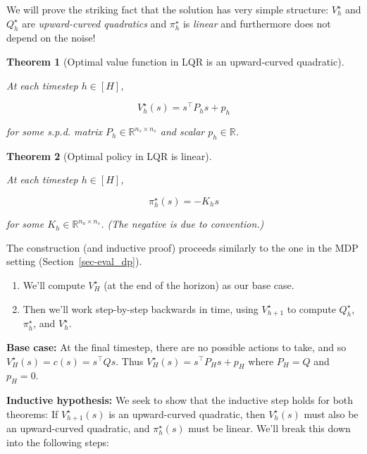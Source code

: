 \documentclass[
  letterpaper,
  DIV=11,
  numbers=noendperiod]{scrreprt}
\providecommand{\tightlist}{%
  \setlength{\itemsep}{0pt}\setlength{\parskip}{0pt}}\usepackage{longtable,booktabs,array}
\theoremstyle{plain}
\theoremstyle{plain}
\newtheorem{theorem}{Theorem}[chapter]
\theoremstyle{definition}
\theoremstyle{definition}
\theoremstyle{remark}
\begin{document}
We will prove the striking fact that the solution has very simple
structure: \(V_h^\star\) and \(Q^\star_h\) are \emph{upward-curved
quadratics} and \(\pi_h^\star\) is \emph{linear} and furthermore does
not depend on the noise!

\begin{theorem}[Optimal value function in LQR is an upward-curved
quadratic]\protect\hypertarget{thm-optimal_value_lqr_quadratic}{}\label{thm-optimal_value_lqr_quadratic}

At each timestep \(h\in [H]\),

\[
V^\star_h(s) = s^\top P_hs+ p_h
\]

for some s.p.d. matrix \(P_h\in \mathbb{R}^{n_s\times n_s}\) and scalar
\(p_h\in \mathbb{R}\).

\end{theorem}

\begin{theorem}[Optimal policy in LQR is
linear]\protect\hypertarget{thm-optimal_policy_lqr_linear}{}\label{thm-optimal_policy_lqr_linear}

At each timestep \(h\in [H]\),

\[
\pi^\star_h(s) = - K_hs
\]

for some \(K_h\in \mathbb{R}^{n_a\times n_s}\). (The negative is due to
convention.)

\end{theorem}

The construction (and inductive proof) proceeds similarly to the one in
the MDP setting (Section~\ref{sec-eval_dp}).

\begin{enumerate}
\def\labelenumi{\arabic{enumi}.}
\tightlist
\item
  We'll compute \(V_H^\star\) (at the end of the horizon) as our base
  case.
\item
  Then we'll work step-by-step backwards in time, using
  \(V_{h+1}^\star\) to compute \(Q_h^\star\), \(\pi_{h}^\star\), and
  \(V_h^\star\).
\end{enumerate}

\textbf{Base case:} At the final timestep, there are no possible actions
to take, and so \(V^\star_H(s) = c(s) = s^\top Q s\). Thus
\(V_H^\star(s) = s^\top P_Hs+ p_H\) where \(P_H= Q\) and \(p_H= 0\).

\textbf{Inductive hypothesis:} We seek to show that the inductive step
holds for both theorems: If \(V^\star_{h+1}(s)\) is an upward-curved
quadratic, then \(V^\star_h(s)\) must also be an upward-curved
quadratic, and \(\pi^\star_h(s)\) must be linear. We'll break this down
into the following steps:
\end{document}
